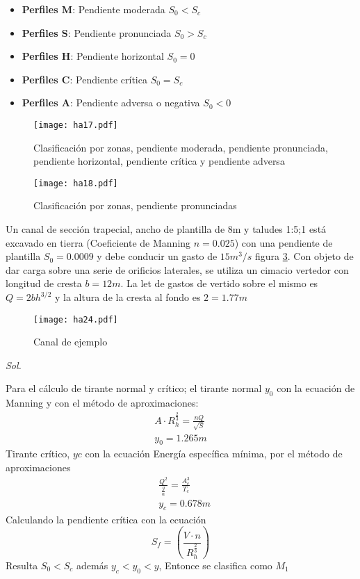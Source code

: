 \begin{itemize}
    \item \textbf{Perfiles M}: Pendiente moderada $S_0<S_c$
    \item \textbf{Perfiles S}: Pendiente pronunciada $S_0>S_c$
    \item \textbf{Perfiles H}: Pendiente horizontal $S_0=0$
    \item \textbf{Perfiles C}: Pendiente crítica $S_0=S_c$
    \item \textbf{Perfiles A}: Pendiente adversa o negativa $S_0<0$
\end{itemize}
\begin{figure}[h!]
\centering
\texttt{[image: ha17.pdf]}
\caption{Clasificación por zonas, pendiente moderada, pendiente pronunciada, pendiente horizontal, pendiente crítica y pendiente adversa}
\label{ha17}
\end{figure}
\begin{figure}[h!]
    \centering
    \texttt{[image: ha18.pdf]}
    \caption{Clasificación por zonas, pendiente pronunciadas}
    \label{ha18}
\end{figure}

\begin{example}
    Un canal de sección trapecial, ancho de plantilla de 8m y taludes 1:5;1 está excavado en tierra (Coeficiente de Manning $n=0.025$) con una pendiente de plantilla $S_0=0.0009$ y debe conducir un gasto de $15m^3/s$ figura \ref{ha24}. Con objeto de dar carga sobre una serie de orificios laterales, se utiliza un cimacio vertedor con longitud de cresta $b=12m$. La let de gastos de vertido sobre el mismo es $Q=2bh^{3/2}$ y la altura de la cresta al fondo es $2=1.77m$
\end{example}
\begin{figure}[h!]
\centering
  \texttt{[image: ha24.pdf]}
  \caption{Canal de ejemplo}
  \label{ha24}
\end{figure}

\textit{ Sol. }

Para el cálculo de tirante normal y crítico; el tirante normal $y_0$ con la ecuación de Manning y con el método de aproximaciones:
\begin{align*}
    A\cdot R_h^{\frac{2}{3}} = \frac{nQ}{\sqrt{S}}\\
    y_0 = 1.265m
\end{align*}
Tirante crítico, $yc$ con la ecuación Energía específica mínima, por el método de aproximaciones
\begin{align*}
    &\frac{Q^2}{\frac{g}{\alpha}} = \frac{A_c^3}{T_c}\\
    &y_c = 0.678m
\end{align*}
Calculando la pendiente crítica con la ecuación 
\begin{equation*}
    S_f = \left(\frac{V\cdot n}{R_h^{\frac{2}{3}}}\right)
\end{equation*}
Resulta $S_0<S_c$ además $y_c<y_0<y$, Entonce se clasifica como $M_1$

